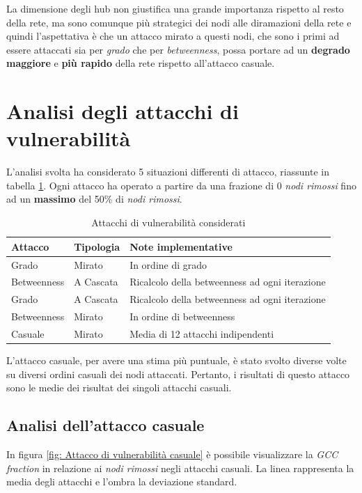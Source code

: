 La dimensione degli hub non giustifica una grande importanza rispetto al resto della rete, ma sono comunque più strategici dei nodi alle diramazioni della rete e quindi l'aspettativa è che un attacco mirato a questi nodi, che sono i primi ad essere attaccati sia per \textit{grado} che per \textit{betweenness}, possa portare ad un \textbf{degrado} \textbf{maggiore} e \textbf{più rapido} della rete rispetto all'attacco casuale. 

\section{Analisi degli attacchi di vulnerabilità}
L'analisi svolta ha considerato 5 situazioni differenti di attacco, riassunte in tabella \ref{tab: Attacchi di vulnerabilità considerati}. Ogni attacco ha operato a partire da una frazione di 0 \textit{nodi rimossi} fino ad un \textbf{massimo} del 50\% di \textit{nodi rimossi}.

\vspace{1em}
\begin{table}[!ht]
\centering
\begin{tabular}{l l l}
\hline
\textbf{Attacco} & \textbf{Tipologia} & \textbf{Note implementative} \\
\hline
Grado & Mirato & In ordine di grado \\
Betweenness & A Cascata & Ricalcolo della betweenness ad ogni iterazione \\
Grado & A Cascata & Ricalcolo della betweenness ad ogni iterazione \\
Betweenness & Mirato & In ordine di betweenness \\
Casuale & Mirato & Media di 12 attacchi indipendenti \\
\hline
\end{tabular}
\caption{Attacchi di vulnerabilità considerati}
\label{tab: Attacchi di vulnerabilità considerati}
\end{table}
\vspace{1em}

L'attacco casuale, per avere una stima più puntuale, è stato svolto diverse volte su diversi ordini casuali dei nodi attaccati. Pertanto, i risultati di questo attacco sono le medie dei risultat dei singoli attacchi casuali.

\subsection{Analisi dell'attacco casuale}
In figura \ref{fig: Attacco di vulnerabilità casuale} è possibile visualizzare la \textit{GCC fraction} in relazione ai \textit{nodi rimossi} negli attacchi casuali. La linea rappresenta la media degli attacchi e l'ombra la deviazione standard.

